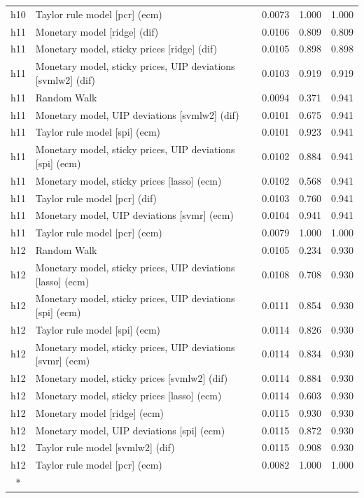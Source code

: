 \begin{ThreePartTable}
\begin{longtable}[t]{cp{5.5cm}ccc}
h10 & \raggedright Taylor rule model [pcr] (ecm) & 0.0073 & 1.000 & 1.000\\
\addlinespace
h11 & \raggedright Monetary model [ridge] (dif) & 0.0106 & 0.809 & 0.809\\
h11 & \raggedright Monetary model, sticky prices [ridge] (dif) & 0.0105 & 0.898 & 0.898\\
h11 & \raggedright Monetary model, sticky prices, UIP deviations [svmlw2] (dif) & 0.0103 & 0.919 & 0.919\\
h11 & \raggedright Random Walk & 0.0094 & 0.371 & 0.941\\
h11 & \raggedright Monetary model, UIP deviations [svmlw2] (dif) & 0.0101 & 0.675 & 0.941\\
h11 & \raggedright Taylor rule model [spi] (ecm) & 0.0101 & 0.923 & 0.941\\
h11 & \raggedright Monetary model, sticky prices, UIP deviations [spi] (ecm) & 0.0102 & 0.884 & 0.941\\
h11 & \raggedright Monetary model, sticky prices [lasso] (ecm) & 0.0102 & 0.568 & 0.941\\
h11 & \raggedright Taylor rule model [pcr] (dif) & 0.0103 & 0.760 & 0.941\\
h11 & \raggedright Monetary model, UIP deviations [svmr] (ecm) & 0.0104 & 0.941 & 0.941\\
h11 & \raggedright Taylor rule model [pcr] (ecm) & 0.0079 & 1.000 & 1.000\\
\addlinespace
h12 & \raggedright Random Walk & 0.0105 & 0.234 & 0.930\\
h12 & \raggedright Monetary model, sticky prices, UIP deviations [lasso] (ecm) & 0.0108 & 0.708 & 0.930\\
h12 & \raggedright Monetary model, sticky prices, UIP deviations [spi] (ecm) & 0.0111 & 0.854 & 0.930\\
h12 & \raggedright Taylor rule model [spi] (ecm) & 0.0114 & 0.826 & 0.930\\
h12 & \raggedright Monetary model, sticky prices, UIP deviations [svmr] (ecm) & 0.0114 & 0.834 & 0.930\\
h12 & \raggedright Monetary model, sticky prices [svmlw2] (dif) & 0.0114 & 0.884 & 0.930\\
h12 & \raggedright Monetary model, sticky prices [lasso] (ecm) & 0.0114 & 0.603 & 0.930\\
h12 & \raggedright Monetary model [ridge] (ecm) & 0.0115 & 0.930 & 0.930\\
h12 & \raggedright Monetary model, UIP deviations [spi] (ecm) & 0.0115 & 0.872 & 0.930\\
h12 & \raggedright Taylor rule model [svmlw2] (dif) & 0.0115 & 0.908 & 0.930\\
h12 & \raggedright Taylor rule model [pcr] (ecm) & 0.0082 & 1.000 & 1.000\\*
\end{longtable}
\end{ThreePartTable}
\endgroup{}
